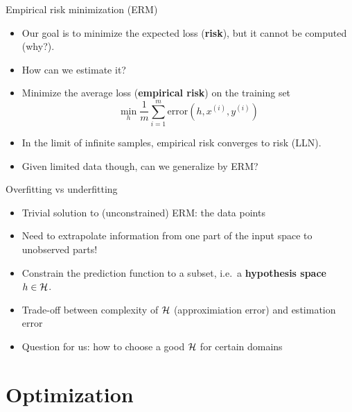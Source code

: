 \documentclass[usenames,dvipsnames,notes,11pt,aspectratio=169]{beamer}
\begin{document}
\begin{frame}
    {Empirical risk minimization (ERM)}
    \begin{itemize}
        \itemsep1em
        \item Our goal is to minimize the expected loss (\textbf{risk}), but it cannot be computed (why?).
        \item How can we estimate it?
    \pause

\item Minimize the {average loss} (\textbf{empirical risk}) on the training set %
    $$
    \min_h \frac{1}{m}\sum_{i=1}^m \text{error}(h, x^{(i)}, y^{(i)})
    $$

\item In the limit of infinite samples, empirical risk converges to risk (LLN).
        \item Given limited data though, can we generalize by ERM?
    \end{itemize}
\end{frame}


\begin{frame}
    {Overfitting vs underfitting}
    \begin{itemize}
        \item Trivial solution to (unconstrained) ERM:  the data points
        \item Need to extrapolate information from one part of the input space to unobserved parts!
    \end{itemize}

    \vspace{10em}
    \pause
    \begin{itemize}
        \item Constrain the prediction function to a subset, i.e.\ a \textbf{hypothesis space} $h\in \mathcal{H}$.
        \item Trade-off between complexity of $\mathcal{H}$ (approximiation error) and estimation error
        \item Question for us: how to choose a good $\mathcal{H}$ for certain domains
    \end{itemize}
\end{frame}

\section{Optimization}
\end{document}
